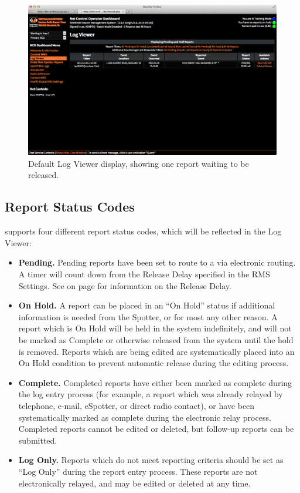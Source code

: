 \documentclass[pdflatex,letterpaper,twoside,12pt]{book}
\begin{document}
\begin{figure}[h]
  \centering
  \includegraphics[width=\textwidth,keepaspectratio=true]{img/dash-log-view-withreport}
  \caption{Default Log Viewer display, showing one report waiting to be released.\label{fig:dash-log-view}}
\end{figure}

\subsection{Report Status Codes}\label{dash-report-status-codes}

 supports four different report status codes, which will be reflected in the Log Viewer:

\begin{itemize}
\item \textbf{Pending.}  Pending reports have been set to route to a  via electronic routing.  A timer will count down from the Release Delay specified in the RMS Settings.  See  on page \pageref{dash-rms-settings} for information on the Release Delay.
\item \textbf{On Hold.}  A report can be placed in an ``On Hold'' status if additional information is needed from the Spotter, or for most any other reason.  A report which is On Hold will be held in the system indefinitely, and will not be marked as Complete or otherwise released from the system until the hold is removed.  Reports which are being edited are systematically placed into an On Hold condition to prevent automatic release during the editing process.
\item \textbf{Complete.}  Completed reports have either been marked as complete during the log entry process (for example, a report which was already relayed by telephone, e-mail, eSpotter, or direct radio contact), or have been systematically marked as complete during the electronic relay process.  Completed reports cannot be edited or deleted, but follow-up reports can be submitted.
\item \textbf{Log Only.}  Reports which do not meet reporting criteria should be set as ``Log Only'' during the report entry process.  These reports are not electronically relayed, and may be edited or deleted at any time.
\end{itemize}
\end{document}
